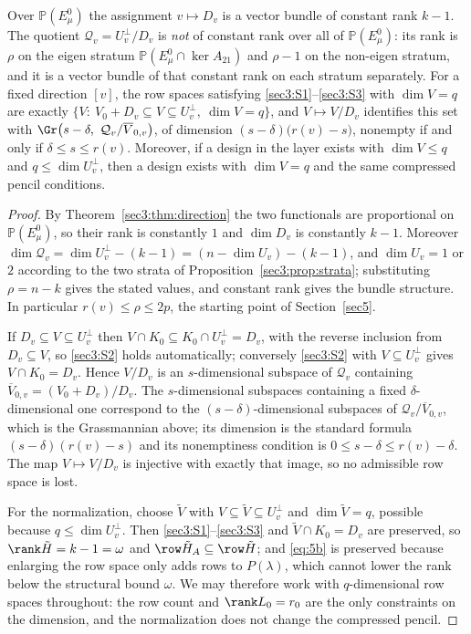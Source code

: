 \begin{lem}
\label{sec3:lem:constantrank}
\label{sec3:lem:fibre}
\label{sec3:lem:fullrank}
Over $\mathbb{P}(E_\mu^0)$ the assignment $v\mapsto D_v$ is a vector bundle of constant rank $k-1$. The
quotient $\mathcal{Q}_v=U_v^\perp/D_v$ is \emph{not} of constant rank over all of $\mathbb{P}(E_\mu^0)$:
its rank is $\rho$ on the eigen stratum $\mathbb{P}(E_\mu^0\cap\ker A_{21})$ and $\rho-1$ on the
non-eigen stratum, and it is a vector bundle of that constant rank on each stratum separately. For a
fixed direction
$[v]$, the row spaces satisfying \ref{sec3:S1}--\ref{sec3:S3} with $\dim V=q$ are exactly
$\{V:\ V_0+D_v\subseteq V\subseteq U_v^\perp,\ \dim V=q\}$, and $V\mapsto V/D_v$ identifies this set
with $\Gr\bigl(s-\delta,\ \mathcal{Q}_v/\overline{V}_{0,v}\bigr)$, of dimension
$(s-\delta)\bigl(r(v)-s\bigr)$, nonempty if and only if $\delta\le s\le r(v)$. Moreover, if a design
in the layer exists with $\dim V\le q$ and $q\le\dim U_v^\perp$, then a design exists with $\dim V=q$
and the same compressed pencil conditions.
\end{lem}
\begin{proof}
By Theorem~\ref{sec3:thm:direction} the two functionals are proportional on $\mathbb{P}(E_\mu^0)$, so
their rank is constantly $1$ and $\dim D_v$ is constantly $k-1$. Moreover
$\dim\mathcal{Q}_v=\dim U_v^\perp-(k-1)=(n-\dim U_v)-(k-1)$, and $\dim U_v=1$ or $2$ according to the
two strata of Proposition~\ref{sec3:prop:strata}; substituting $\rho=n-k$ gives the stated values, and
constant rank gives the bundle structure. In particular $r(v)\le\rho\le2p$, the starting point of
Section~\ref{sec5}.

If $D_v\subseteq V\subseteq U_v^\perp$ then $V\cap K_0\subseteq K_0\cap U_v^\perp=D_v$, with the
reverse inclusion from $D_v\subseteq V$, so \ref{sec3:S2} holds automatically; conversely
\ref{sec3:S2} with $V\subseteq U_v^\perp$ gives $V\cap K_0=D_v$. Hence $V/D_v$ is an $s$-dimensional
subspace of $\mathcal{Q}_v$ containing $\overline{V}_{0,v}=(V_0+D_v)/D_v$. The $s$-dimensional
subspaces containing a fixed $\delta$-dimensional one correspond to the $(s-\delta)$-dimensional
subspaces of $\mathcal{Q}_v/\overline{V}_{0,v}$, which is the Grassmannian above; its dimension is the
standard formula $(s-\delta)(r(v)-s)$ and its nonemptiness condition is $0\le s-\delta\le r(v)-\delta$.
The map $V\mapsto V/D_v$ is injective with exactly that image, so no admissible row space is lost.

For the normalization, choose $\tilde V$ with $V\subseteq\tilde V\subseteq U_v^\perp$ and
$\dim\tilde V=q$, possible because $q\le\dim U_v^\perp$. Then \ref{sec3:S1}--\ref{sec3:S3} and
$\tilde V\cap K_0=D_v$ are preserved, so $\rank\tilde H=k-1=\omega$ and
$\row\tilde H_A\subseteq\row\tilde H$; and \eqref{eq:5b} is preserved because enlarging the row space
only adds rows to $P(\lambda)$, which cannot lower the rank below the structural bound $\omega$. We may
therefore work with $q$-dimensional row spaces throughout: the row count and $\rank L_0=r_0$ are the
only constraints on the dimension, and the normalization does not change the compressed pencil.
\end{proof}

